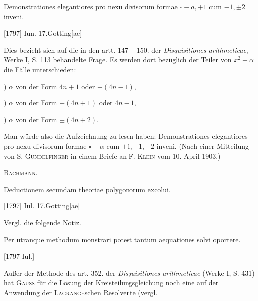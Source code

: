 \indent Demonstrationes elegantiores pro nexu divisorum formae \(\square-a,+1\) cum \(-1,\pm2\) inveni.
\par\noindent\hfill[1797] Iun. 17.\quad Gotting[ae]

\medskip\begingroup\small
\indent Dies bezieht sich auf die in den artt. 147.—150. der \textit{Disquisitiones arithmeticae}, Werke I, S. 113 behandelte Frage. Es werden dort bezüglich der Teiler von \(x^2-\alpha\) die Fälle unterschieden:
\par{}) \(\alpha\) von der Form \(4n+1\) oder \(-(4n-1)\),
\par{}) \(\alpha\) von der Form \(-(4n+1)\) oder \(4n-1\),
\par{}) \(\alpha\) von der Form \(\pm(4n+2)\).
\par\noindent Man würde also die Aufzeichnung zu lesen haben: Demonstrationes elegantiores pro nexu divisorum formae \(\square-\alpha\) cum \(+1,-1,\pm2\) inveni. (Nach einer Mitteilung von S. \textsc{Gundelfinger} in einem Briefe an F. \textsc{Klein} vom 10. April 1903.)
\par\noindent\hfill\textsc{Bachmann.}
\par\endgroup

\indent Deductionem secundam theoriae polygonorum excolui.
\par\noindent\hfill[1797] Iul. 17.\quad Gotting[ae]

\medskip\begingroup\small
\indent Vergl. die folgende Notiz.
\par\endgroup

\indent Per utranque methodum monstrari potest  tantum aequationes solvi oportere.
\par\noindent\hfill[1797 Iul.]

\medskip\begingroup\small
\indent Außer der Methode des art. 352. der \textit{Disquisitiones arithmeticae} (Werke I, S. 431) hat \textsc{Gauss} für die Lösung der Kreisteilungsgleichung noch eine auf der Anwendung der \textsc{Lagrange}schen Resolvente (vergl.
\par\endgroup

